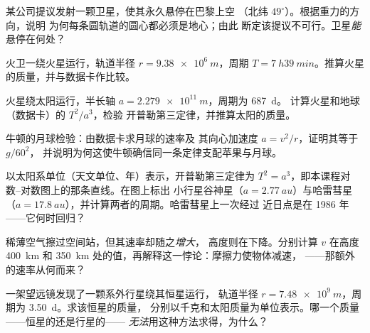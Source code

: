 \begin{exercise}[$\star\star$]\label{exo:g12:satellites-kepler:7}
某公司提议发射一颗卫星，使其永久悬停在巴黎上空
（北纬 $49^\circ$）。根据重力的方向，说明
为何每条圆轨道的圆心都必须是地心；由此
断定该提议不可行。卫星\emph{能}悬停在何处？
\end{exercise}

\begin{exercise}[$\star\star$]\label{exo:g12:satellites-kepler:8}
火卫一绕火星运行，轨道半径 $r = \qty{9.38e6}{m}$，周期 $T = \qty{7}{h}
\qty{39}{min}$。推算火星的质量，并与数据卡作比较。
\end{exercise}

\begin{exercise}[$\star\star$]\label{exo:g12:satellites-kepler:9}
火星绕太阳运行，半长轴 $a = \qty{2.279e11}{m}$，周期为 \qty{687}{d}。
计算火星和地球（数据卡）的 $T^2/a^3$，检验
开普勒第三定律，并推算太阳的质量。
\end{exercise}

\begin{exercise}[$\star\star$]\label{exo:g12:satellites-kepler:10}
牛顿的月球检验：由数据卡求月球的速率及
其向心加速度 $a = v^2/r$，证明其等于 $g/60^2$，
并说明为何这使牛顿确信同一条定律支配苹果与月球。
\end{exercise}

\begin{exercise}[$\star\star$]\label{exo:g12:satellites-kepler:11}
以太阳系单位（天文单位、年）表示，开普勒第三定律为
$T^2 = a^3$，即本课程对数–对数图上的那条直线。在图上标出
小行星谷神星（$a = \qty{2.77}{au}$）与哈雷彗星
（$a = \qty{17.8}{au}$），并计算两者的周期。哈雷彗星上一次经过
近日点是在 1986 年——它何时回归？
\end{exercise}

\begin{exercise}[$\star\star\star$]\label{exo:g12:satellites-kepler:12}
稀薄空气擦过空间站，但其速率却随之\emph{增大}，
高度则在下降。分别计算 $v$ 在高度 \qty{400}{km} 和
\qty{350}{km} 处的值，再解释这一悖论：摩擦力使物体减速，
——那额外的速率从何而来？
\end{exercise}

\begin{exercise}[$\star\star\star$]\label{exo:g12:satellites-kepler:13}
一架望远镜发现了一颗系外行星绕其恒星运行，
轨道半径 $r = \qty{7.48e9}{m}$，周期为 \qty{3.50}{d}。求该恒星的质量，
分别以千克和太阳质量为单位表示。哪一个质量——恒星的还是行星的——
\emph{无法}用这种方法求得，为什么？
\end{exercise}

